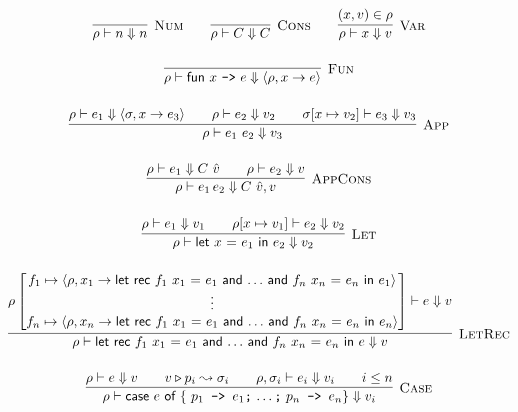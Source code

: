 \documentclass{article}
\def\code#1{\textsf{#1}}
\def\rt{\Downarrow}
\def\envj#1#2#3{#1 \vdash #2 \rt #3}
\def\closure#1#2#3{\langle #3 , #1 \to #2\rangle}
\def\tsc#1{\textsc{#1}}
\def\matchj#1#2#3{#1 \triangleright #2 \leadsto #3}
\begin{document}
\begin{gather*}
\infer[\tsc{Num}]{\envj \rho n n}{}\qquad
\infer[\tsc{Cons}]{\envj \rho C C}{}\qquad
\infer[\tsc{Var}]{\envj \rho x v}{(x,v)\in \rho}\\[12pt]
\infer[\tsc{Fun}]{\envj \rho {\code{fun $x$ \texttt{->} $e$}} {\closure x e \rho}}{}\\[12pt]
\infer[\tsc{App}]{\envj \rho {e_1 \ e_2} v_3}{\envj{\rho}{e_1}{\closure x {e_3} {\sigma}} && \envj \rho {e_2} {v_2} && \envj{\sigma [x\mapsto v_2]}{e_3}{v_3}}\\[12pt]
\infer[\tsc{AppCons}]{\envj{\rho}{e_1\, e_2}{C\ \hat{v},v}}{\envj{\rho}{e_1}{C\ \hat{v}} && \envj{\rho}{e_2}{v}}\\[12pt]
\infer[\tsc{Let}]{\envj \rho {\code{let $x$ = $e_1$ in $e_2$}} {v_2}}{\envj \rho {e_1} {v_1} && \envj {\rho[x\mapsto v_1]} {e_2} {v_2}}\\[12pt]
\infer[\tsc{LetRec}]{\envj \rho {\code{let rec $f_1$ $x_1$ = $e_1$ and $\ldots$ and $f_n$ $x_n$ = $e_n$ in $e$}} {v}}{ \envj{\rho\begin{bmatrix}f_1 \mapsto \closure {x_1} {\code{let rec $f_1$ $x_1$ = $e_1$ and $\ldots$ and $f_n$ $x_n$ = $e_n$ in $e_1$}}{\rho}\\\vdots\\f_n \mapsto \closure {x_n} {\code{let rec $f_1$ $x_1$ = $e_1$ and $\ldots$ and $f_n$ $x_n$ = $e_n$ in $e_n$}}{\rho}\end{bmatrix}}{e}{v}}\\[12pt]
\infer[\tsc{Case}]{\envj \rho {\code{case $e$ of \{ $p_1 \texttt{ -> } e_1 \texttt{;}$ $\ldots\texttt{;}$ $p_n \texttt{ -> } e_n$\}}} {v_i}}{\envj \rho {e} {v} && \matchj v {p_i} {\sigma_i} && \envj {\rho,\sigma_i}{e_i}{v_i} && i \leq n}\\[12pt]

\end{gather*}
\end{document}
